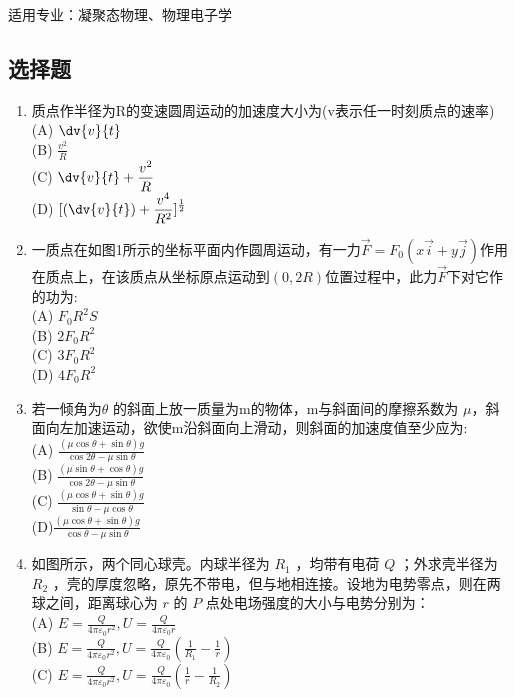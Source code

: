 适用专业：凝聚态物理、物理电子学
\subsection{选择题}
\begin{enumerate}
\item 质点作半径为R的变速圆周运动的加速度大小为(v表示任一时刻质点的速率)\\
(A) $\displaystyle \dv{v}{t}$\\
(B) $\displaystyle \frac{v^2}{R}$\\
(C) $\displaystyle \dv{v}{t}+\frac{v^2}{R}$\\
(D) $\displaystyle [(\dv{v}{t})+\frac{v^4}{R^2}]^\frac{1}{2}$
\item 一质点在如图1所示的坐标平面内作圆周运动，有一力$\vec F=F_0(x\vec i+y \vec j)$作用在质点上，在该质点从坐标原点运动到$(0,2R)$位置过程中，此力$\vec F$下对它作的功为:\\
(A) $F_0R^2S$\\
(B) $2F_0R^2$\\
(C) $3F_0R^2$\\
(D) $4F_0R^2$
\item 若一倾角为$\theta$ 的斜面上放一质量为m的物体，m与斜面间的摩擦系数为 $\mu$，斜面向左加速运动，欲使m沿斜面向上滑动，则斜面的加速度值至少应为:\\
(A) $\displaystyle \frac{(\mu \cos \theta+\sin \theta)g}{\cos 2\theta -\mu \sin \theta}$\\
(B) $\displaystyle\frac{(\mu \sin \theta+\cos \theta)g}{\cos 2\theta -\mu \sin \theta}$\\
(C) $\displaystyle \frac{(\mu \cos \theta+\sin \theta)g}{\sin \theta -\mu \cos\theta}$\\
(D)$\displaystyle \frac{(\mu \cos \theta+\sin \theta)g}{\cos \theta -\mu \sin\theta}$
\item 如图所示，两个同心球壳。内球半径为 $R_1$ ，均带有电荷 $Q$ ；外求壳半径为 $R_2$ ，壳的厚度忽略，原先不带电，但与地相连接。设地为电势零点，则在两球之间，距离球心为 $r$ 的 $P$ 点处电场强度的大小与电势分别为：\\
(A) $\displaystyle E=\frac{Q}{4\pi\varepsilon_0 r^2},U=\frac{Q}{4\pi\varepsilon_0 r}$\\
(B) $\displaystyle E=\frac{Q}{4\pi\varepsilon_0 r^2},U=\frac{Q}{4\pi\varepsilon_0} (\frac{1}{R_1}-\frac{1}{r})$\\
(C) $\displaystyle E=\frac{Q}{4\pi\varepsilon_0 r^2},U=\frac{Q}{4\pi\varepsilon_0} (\frac{1}{r}-\frac{1}{R_2}) $\\

\end{enumerate}
